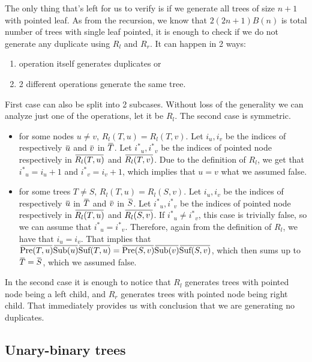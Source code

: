 \documentclass[final]{article}
\theoremstyle{definition}
\theoremstyle{remark}
\newcommand{\ols}[1]{\mskip.5\thinmuskip\overline{\mskip-.5\thinmuskip {#1} \mskip-.5\thinmuskip}\mskip.5\thinmuskip} %
\newcommand{\enc}[1]{\ensuremath{\ols{#1}}}
\newcommand{\pointed}[1]{\ensuremath{{#1}^*}}
\DeclareMathOperator{\tSub}{\text{Sub}}
\DeclareMathOperator{\tPre}{\text{Pre}}
\DeclareMathOperator{\tSuf}{\text{Suf}}
\begin{document}
The only thing that's left for us to verify is if we generate all trees of size \(n + 1\) with pointed leaf. As from the recursion, we know that \(2 (2n + 1) B(n)\) is total number of trees with single leaf pointed, it is enough to check if we do not generate any duplicate using \(R_l\) and \(R_r\). It can happen in 2 ways:
\begin{enumerate}
    \item operation itself generates duplicates or
    \item 2 different operations generate the same tree.
\end{enumerate}

First case can also be split into 2 subcases. Without loss of the generality we can analyze just one of the operations, let it be \(R_l\). The second case is symmetric.
\begin{itemize}
    \item for some nodes \(u \neq v\), \(R_l(T, u) = R_l(T, v)\). Let \(i_u, i_v\) be the indices of respectively \(\enc{u}\) and \(\enc{v}\) in \(\enc{T}\). Let \(\pointed{i}_u, \pointed{i}_v\) be the indices of pointed node respectively in \(\enc{R_l(T, u)}\) and \(\enc{R_l(T, v)}\). Due to the definition of \(R_l\), we get that \(\pointed{i}_u = i_u + 1\) and \(\pointed{i}_v = i_v + 1\), which implies that \(u = v\) what we assumed false.
    \item for some trees \(T \neq S\), \(R_l(T, u) = R_l(S, v)\). Let \(i_u, i_v\) be the indices of respectively \(\enc{u}\) in \(\enc{T}\) and \(\enc{v}\) in \(\enc{S}\). Let \(\pointed{i}_u, \pointed{i}_v\) be the indices of pointed node respectively in \(\enc{R_l(T, u)}\) and \(\enc{R_l(S, v)}\). If \(\pointed{i}_u \neq \pointed{i}_v\), this case is trivially false, so we can assume that \(\pointed{i}_u = \pointed{i}_v\). Therefore, again from the definition of \(R_l\), we have that \(i_u = i_v\). That implies that \(\enc{\tPre(T, u)} \enc{\tSub(u)} \enc{\tSuf(T, u)} = \enc{\tPre(S, v)} \enc{\tSub(v)} \enc{\tSuf(S, v)} \), which then sums up to \(\enc{T} = \enc{S}\), which we assumed false.
\end{itemize}

In the second case it is enough to notice that \(R_l\) generates trees with pointed node being a left child, and \(R_r\) generates trees with pointed node being right child. That immediately provides us with conclusion that we are generating no duplicates.

\subsection{Unary-binary trees}%
\label{sub:unary_binary_trees}
\end{document}
